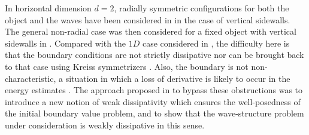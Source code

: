 \documentclass[10pt]{amsart}
\theoremstyle{definition}
\begin{document}
In horizontal dimension $d=2$, radially symmetric configurations for both the object and the waves have been considered in \cite{Bocchi1,Bocchi2}
in the case of vertical sidewalls.
The general non-radial case was then considered for a fixed object with vertical sidewalls in \cite{IguchiLannes2023}.
Compared with the $1D$ case considered in \cite{IguchiLannes2021}, the difficulty here is that
the boundary conditions are not strictly dissipative nor can be brought back to that case using Kreiss symmetrizers \cite{Majda,Metivier,BenzoniSerre,Audiard}.
Also, the boundary is not non-characteristic,
a situation in which a loss of derivative is likely to occur in the energy estimates \cite{Gues,Secchi,MajdaOsher,CoulombelSecchi}.
The approach proposed in \cite{IguchiLannes2023} to bypass these obstructions was to introduce a new notion of weak dissipativity
which ensures the well-posedness of the initial boundary value problem,
and to show that the wave-structure problem under consideration is weakly dissipative in this sense.
\end{document}
